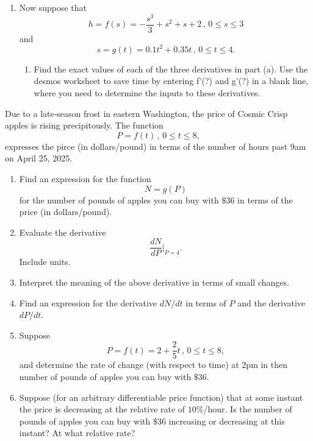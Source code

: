 \documentclass{ximera}
\begin{document}
\begin{question}
\begin{enumerate}
\item Now suppose that
\[
    h = f(s) = -\frac{s^3}{3} + s^2 + s + 2 \, , \, 0\leq s\leq 3
\]
and
\[
    s = g(t) = 0.1 t^2 + 0.35t \, , \, 0\leq t \leq 4.
\]

\begin{enumerate}
\item Find the exact values of each of the three derivatives in part (a). Use the desmos worksheet to save time by entering f'(?) and g'(?) in a blank line, where you need to determine the inputs to these derivatives.
\end{enumerate}
\end{enumerate}

\end{question}



\begin{question} \label{QLkmdfdsrr}
Due to a late-season frost in eastern Washington, the price of Cosmic Crisp apples is rising precipitously. The function 
\[
          P = f(t) \, , \, 0\leq t \leq 8 ,
\]
expresses the pirce (in dollars/pound) in terms of the number of hours past 9am on April 25, 2025.

\begin{enumerate}
\item Find an expression for the function
\[
       N = g(P)
\]
for the number of pounds of apples you can buy with $\$36$ in terms of the price (in dollars/pound).

\item Evaluate the derivative
\[
 \frac{dN}{dP}\Big|_{P=4} .
\]
Include units.

\item Interpret the meaning of the above derivative in terms of small changes.

\item Find an expression for the derivative $dN/dt$ in terms of $P$ and the derivative $dP/dt$.

\item Suppose 
\[
     P = f(t) = 2 + \frac{2}{5}t \, , \, 0\leq t \leq 8 ,
\]
and determine the rate of change (with respect to time) at 2pm in then number of pounds of apples you can buy with $\$36$.

\item Suppose (for an arbitrary differentiable price function) that at some instant the price is decreasing at the relative rate of $10\%$/hour. Is the number of pounds of apples you can buy with $\$36$ increasing or decreasing at this instant? At what relative rate?

\end{enumerate}
\end{question}
\end{document}
